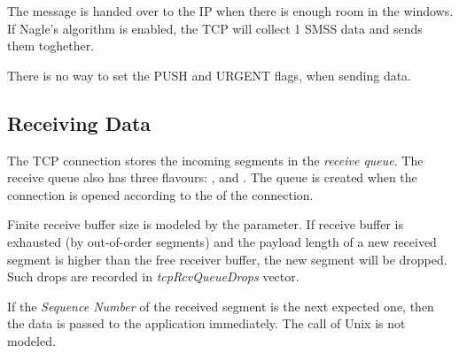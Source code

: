 %
% 
% 


The message is handed over to the IP when there is
enough room in the windows. If Nagle's algorithm is
enabled, the TCP will collect 1 SMSS data and sends
them toghether.

\begin{note}
There is no way to set the PUSH and URGENT flags, when sending data.
\end{note}


\subsection{Receiving Data}

The TCP connection stores the incoming segments in the
\emph{receive queue}. The receive queue also has three flavours:
, 
and . The queue is created
when the connection is opened according to the 
of the connection.

Finite receive buffer size is modeled by the 
parameter. If receive buffer is exhausted (by out-of-order
segments) and the payload length of a new received segment
is higher than the free receiver buffer, the new segment will be dropped.
Such drops are recorded in \emph{tcpRcvQueueDrops} vector.

If the \emph{Sequence Number} of the received segment is the next
expected one, then the data is passed
to the application immediately. The  call of
Unix is not modeled.

